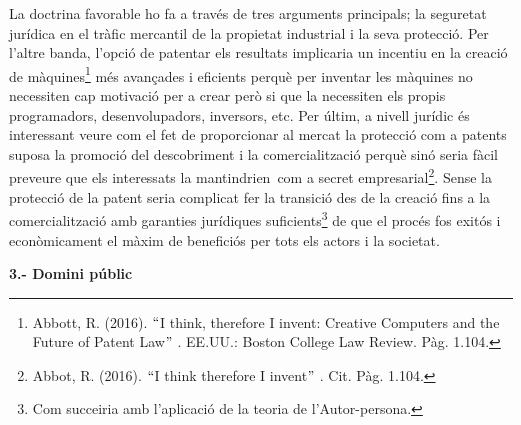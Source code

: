 \documentclass[12pt]{article}
\renewcommand{\_}{\kern-1.5pt\textunderscore\kern-1.5pt}
\begin{document}
\begin{itemize}
\vspace{\baselineskip}
La doctrina favorable ho fa a través de tres arguments principals; la seguretat jurídica en el tràfic mercantil de la propietat industrial i la seva protecció. Per l’altre banda, l’opció de patentar els resultats implicaria un incentiu en la creació de màquines\footnote{ Abbott, R. (2016). $``$I think, therefore I invent: Creative Computers and the Future of Patent Law$"$ . EE.UU.: Boston College Law Review. Pàg. 1.104. } més avançades i eficients perquè per inventar les màquines no necessiten cap motivació per a crear però si que la necessiten els propis programadors, desenvolupadors, inversors, etc. Per últim, a nivell jurídic és interessant veure com el fet de proporcionar al mercat la protecció com a patents suposa la promoció del descobriment i la comercialització perquè sinó seria fàcil preveure que els interessats la mantindrien\  com a secret empresarial\footnote{ Abbot, R. (2016). $``$I think therefore I invent$"$ . Cit. Pàg. 1.104.  }. Sense la protecció de la patent seria complicat fer la transició des de la creació fins a la comercialització amb garanties jurídiques suficients\footnote{ Com succeiria amb l’aplicació de la teoria de l’Autor-persona.  } de que el procés fos exitós i econòmicament el màxim de beneficiós per tots els actors i la societat. \par


\vspace{\baselineskip}
\textbf{3.- Domini públic}\par



\end{itemize}
\end{document}
